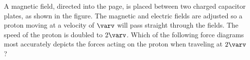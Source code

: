 \documentclass{../../../oss-apphys-exam}
\begin{document}
\begin{multicols*}{2}
\begin{questions}

%
%    
    \question A magnetic field, directed into the page, is placed between two
    charged capacitor plates, as shown in the figure. The magnetic and electric
    fields are adjusted so a proton moving at a velocity of $\varv$ will pass
    straight through the fields. The speed of the proton is doubled to $2\varv$.
    Which of the following force diagrams most accurately depicts the forces
    acting on the proton when traveling at $2\varv$?
    \begin{center}
    \end{center}
    \begin{choices}
      \choice
      

\end{choices}
\end{questions}
\end{multicols*}
\end{document}
